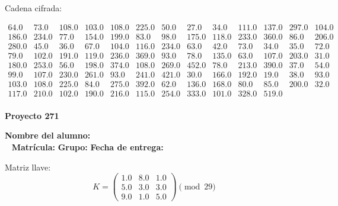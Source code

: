 \documentclass[12pt]{article}
\begin{document}
Cadena cifrada:
\begin{center}
$\begin{array}{lllllllllllll}
64.0 & 73.0 & 108.0 & 103.0 & 108.0 & 225.0 & 50.0 & 27.0 & 34.0 & 111.0 & 137.0 & 297.0 & 104.0\\
186.0 & 234.0 & 77.0 & 154.0 & 199.0 & 83.0 & 98.0 & 175.0 & 118.0 & 233.0 & 360.0 & 86.0 & 206.0\\
280.0 & 45.0 & 36.0 & 67.0 & 104.0 & 116.0 & 234.0 & 63.0 & 42.0 & 73.0 & 34.0 & 35.0 & 72.0\\
79.0 & 102.0 & 191.0 & 119.0 & 236.0 & 369.0 & 93.0 & 78.0 & 135.0 & 63.0 & 107.0 & 203.0 & 31.0\\
180.0 & 253.0 & 56.0 & 198.0 & 374.0 & 108.0 & 269.0 & 452.0 & 78.0 & 213.0 & 390.0 & 37.0 & 54.0\\
99.0 & 107.0 & 230.0 & 261.0 & 93.0 & 241.0 & 421.0 & 30.0 & 166.0 & 192.0 & 19.0 & 38.0 & 93.0\\
103.0 & 108.0 & 225.0 & 84.0 & 275.0 & 392.0 & 62.0 & 136.0 & 168.0 & 80.0 & 85.0 & 200.0 & 32.0\\
117.0 & 210.0 & 102.0 & 190.0 & 216.0 & 115.0 & 254.0 & 333.0 & 101.0 & 328.0 & 519.0\\
\end{array}$
\end{center}

\newpage


\textbf{Proyecto 271}

\textbf{Nombre del alumno:} \underline{\hspace{13cm}}\\\
\vspace{1cm}
\textbf{Matrícula:} \underline{\hspace{4cm}} \hspace{1cm}
\textbf{Grupo:} \underline{\hspace{2cm}}
\textbf{Fecha de entrega:} \underline{\hspace{2cm}}

\medskip

Matriz llave:
\[
K = \begin{pmatrix}
1.0 & 8.0 & 1.0\\
5.0 & 3.0 & 3.0\\
9.0 & 1.0 & 5.0
\end{pmatrix} \pmod{29}
\]
\end{document}
